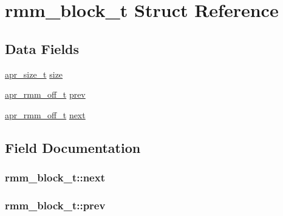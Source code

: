 \hypertarget{structrmm__block__t}{}\section{rmm\+\_\+block\+\_\+t Struct Reference}
\label{structrmm__block__t}
\subsection*{Data Fields}
\begin{DoxyCompactItemize}
\item 
\hyperlink{group__apr__platform_gaaa72b2253f6f3032cefea5712a27540e}{apr\+\_\+size\+\_\+t} \hyperlink{structrmm__block__t_a63d53f13f4160a3d45c2111775516b69}{size}
\item 
\hyperlink{group__APR__Util__RMM_ga70b508c81a0bc75350efdefb3410af12}{apr\+\_\+rmm\+\_\+off\+\_\+t} \hyperlink{structrmm__block__t_af8520c3c2c878764c2a175d95baad092}{prev}
\item 
\hyperlink{group__APR__Util__RMM_ga70b508c81a0bc75350efdefb3410af12}{apr\+\_\+rmm\+\_\+off\+\_\+t} \hyperlink{structrmm__block__t_a6491a122a166d37ae57a6816877880be}{next}
\end{DoxyCompactItemize}


\subsection{Field Documentation}
\subsubsection[{\texorpdfstring{next}{next}}]{ rmm\+\_\+block\+\_\+t\+::next}\hypertarget{structrmm__block__t_a6491a122a166d37ae57a6816877880be}{}\label{structrmm__block__t_a6491a122a166d37ae57a6816877880be}
\subsubsection[{\texorpdfstring{prev}{prev}}]{ rmm\+\_\+block\+\_\+t\+::prev}\hypertarget{structrmm__block__t_af8520c3c2c878764c2a175d95baad092}{}\label{structrmm__block__t_af8520c3c2c878764c2a175d95baad092}

